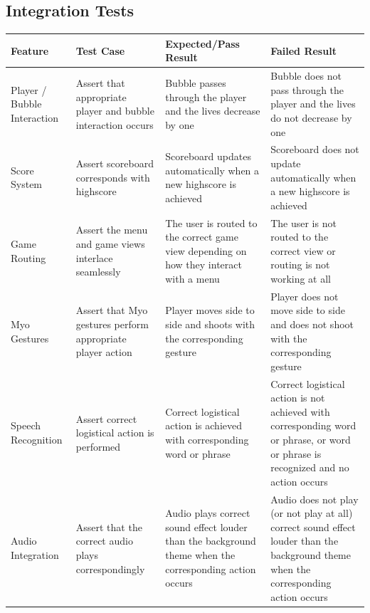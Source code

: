 \documentclass{article}
\begin{document}
\clearpage

\subsection{Integration Tests}
\begin{center}
\begin{tabular}{ | m{5em} | m{4cm}| m{4cm} |  m{4cm} |} 
      \hline
      Feature & Test Case & Expected/Pass Result & Failed Result \\ 
      \hline
      Player / Bubble Interaction & Assert that appropriate player and bubble interaction occurs & Bubble passes through the player and the lives decrease by one & Bubble does not pass through the player and the lives do not decrease by one \\ 
      \hline
      Score System & Assert scoreboard corresponds with highscore & Scoreboard updates automatically when a new highscore is achieved & Scoreboard does not update automatically when a new highscore is achieved \\ 
      \hline
      Game Routing & Assert the menu and game views interlace seamlessly & The user is routed to the correct game view depending on how they interact with a menu & The user is not routed to the correct view or routing is not working at all \\ 
      \hline
      Myo Gestures & Assert that Myo gestures perform appropriate player action & Player moves side to side and shoots with the corresponding gesture & Player does not move side to side and does not shoot with the corresponding gesture \\ 
      \hline
      Speech Recognition & Assert correct logistical action is performed & Correct logistical action is achieved with corresponding word or phrase & Correct logistical action is not achieved with corresponding word or phrase, or word or phrase is recognized and no action occurs \\ 
      \hline
      Audio Integration & Assert that the correct audio plays correspondingly & Audio plays correct sound effect louder than the background theme when the corresponding action occurs & Audio does not play (or not play at all) correct sound effect louder than the background theme when the corresponding action occurs \\ 
      \hline
\end{tabular}
\end{center}

\bigskip
\end{document}
